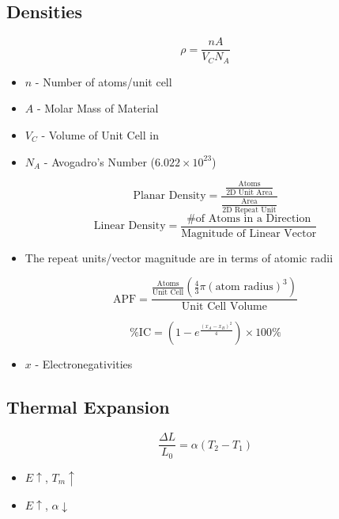 	\subsection{Densities}
		\begin{equation}
			\rho = \frac{nA}{V_{C} N_{A}}
		\end{equation}
		\begin{itemize}[noitemsep]
			\item $n$ - Number of atoms/unit cell
			\item $A$ - Molar Mass of Material
			\item $V_{C}$ - Volume of Unit Cell in \si{\centi \meter \cubic}
			\item $N_{A}$ - Avogadro's Number ($6.022 \times 10^{23}$)
		\end{itemize}

		\begin{equation}
			\text{Planar Density} = \frac{\frac{\text{Atoms}}{\text{2D Unit Area}}}{\frac{\text{Area}}{\text{2D Repeat Unit}}}
		\end{equation}
		\begin{equation}
			\text{Linear Density} = \frac{\text{\# of Atoms in a Direction}}{\text{Magnitude of Linear Vector}}
		\end{equation}
		\begin{itemize}[noitemsep]
			\item The repeat units/vector magnitude are in terms of atomic radii
		\end{itemize}

		\begin{equation}
			\text{APF} = \frac{\frac{\text{Atoms}}{\text{Unit Cell}} \left( \frac{4}{3} \pi \left( \text{atom radius} \right)^{3} \right)}{\text{Unit Cell Volume}}
		\end{equation}
	
		\begin{equation}
			\text{\%IC} = \left( 1 - e^{\frac{\left( x_{A}-x_{B} \right)^{2}}{4}} \right) \times 100\%
		\end{equation}
		\begin{itemize}[noitemsep]
			\item $x$ - Electronegativities
		\end{itemize}

	\subsection{Thermal Expansion}
		\begin{equation}
			\frac{\Delta L}{L_{0}} = \alpha \left( T_{2} - T_{1} \right)
		\end{equation}
		\begin{itemize}[noitemsep]
			\item $E \uparrow$, $T_{m} \uparrow$
			\item $E \uparrow$, $\alpha \downarrow$
		\end{itemize}

